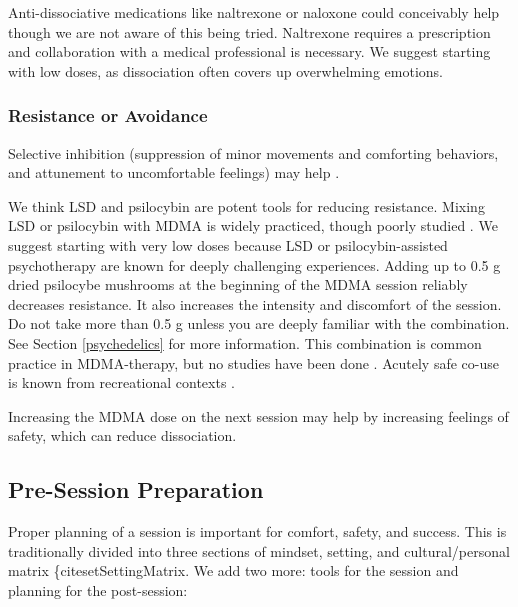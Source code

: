 \documentclass[12pt,letterpaper]{article}
\begin{document}
Anti-dissociative medications like naltrexone or naloxone could conceivably help though we are not aware of this being tried. Naltrexone requires a prescription and collaboration with a medical professional is necessary. We suggest starting with low doses, as dissociation often covers up overwhelming emotions. 

\subsubsection{Resistance or Avoidance}
\label{selectiveInhibition}
Selective inhibition (suppression of minor movements and comforting behaviors, and attunement to uncomfortable feelings) may help \cite{razviPSIP}.

 

We think LSD and psilocybin are potent tools for reducing resistance.  Mixing LSD or psilocybin with MDMA is widely practiced, though poorly studied \cite{zeifmanCo-use}. We suggest starting with very low doses because LSD or psilocybin-assisted psychotherapy are known for deeply challenging experiences. Adding up to 0.5 g dried psilocybe mushrooms at the beginning of the MDMA session reliably decreases resistance. It also increases the intensity and discomfort of the session. Do not take more than 0.5 g unless you are deeply familiar with the combination. See Section \ref{psychedelics} for more information. This combination is common practice in MDMA-therapy, but no studies have been done \cite{colemanPsychedelicPsychotherapy}. Acutely safe co-use is known from recreational contexts \cite{zeifmanCo-use}.

Increasing the MDMA dose on the next session may help by increasing feelings of safety, which can reduce dissociation.
\subsection{Pre-Session Preparation}
\label{prep}
Proper planning of a session is important for comfort, safety, and success. This is traditionally divided into three sections of mindset, setting, and cultural/personal matrix \{cite{setSettingMatrix}. We add two more: tools for the session and planning for the post-session:

\vspace{\baselineskip}
\end{document}
